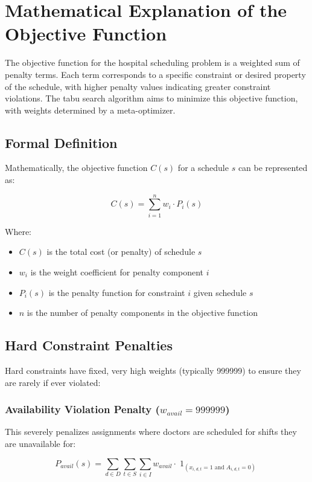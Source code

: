 \documentclass[12pt]{article}
\DeclareMathOperator{\ind}{1}
\begin{document}
\newpage
\section{Mathematical Explanation of the Objective Function}

The objective function for the hospital scheduling problem is a weighted sum of penalty terms. Each term corresponds to a specific constraint or desired property of the schedule, with higher penalty values indicating greater constraint violations. The tabu search algorithm aims to minimize this objective function, with weights determined by a meta-optimizer.

\subsection{Formal Definition}

Mathematically, the objective function $C(s)$ for a schedule $s$ can be represented as:

\begin{equation}
C(s) = \sum_{i=1}^{n} w_i \cdot P_i(s)
\end{equation}

Where:
\begin{itemize}
    \item $C(s)$ is the total cost (or penalty) of schedule $s$
    \item $w_i$ is the weight coefficient for penalty component $i$
    \item $P_i(s)$ is the penalty function for constraint $i$ given schedule $s$
    \item $n$ is the number of penalty components in the objective function
\end{itemize}

\subsection{Hard Constraint Penalties}

Hard constraints have fixed, very high weights (typically 999999) to ensure they are rarely if ever violated:

\subsubsection{Availability Violation Penalty ($w_{avail} = 999999$)}
This severely penalizes assignments where doctors are scheduled for shifts they are unavailable for:

\begin{equation}
P_{avail}(s) = \sum_{d \in D} \sum_{t \in S} \sum_{i \in I} w_{avail} \cdot \ind_{(x_{i,d,t}=1 \text{ and } A_{i,d,t}=0)}
\end{equation}
\end{document}
